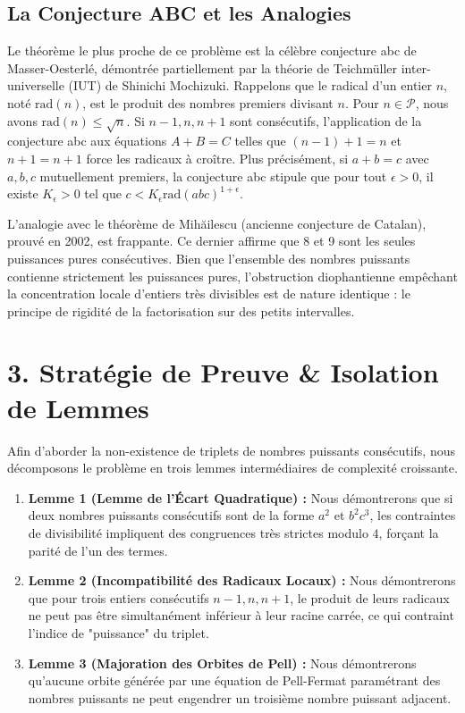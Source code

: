 \documentclass[11pt,a4paper]{article}
\begin{document}
\subsection{La Conjecture ABC et les Analogies}
Le théorème le plus proche de ce problème est la célèbre conjecture abc de Masser-Oesterlé, démontrée partiellement par la théorie de Teichmüller inter-universelle (IUT) de Shinichi Mochizuki.
Rappelons que le radical d'un entier $n$, noté $\text{rad}(n)$, est le produit des nombres premiers divisant $n$. Pour $n \in \mathcal{P}$, nous avons $\text{rad}(n) \le \sqrt{n}$.
Si $n-1, n, n+1$ sont consécutifs, l'application de la conjecture abc aux équations $A+B=C$ telles que $(n-1)+1=n$ et $n+1=n+1$ force les radicaux à croître.
Plus précisément, si $a+b=c$ avec $a,b,c$ mutuellement premiers, la conjecture abc stipule que pour tout $\epsilon > 0$, il existe $K_\epsilon > 0$ tel que $c < K_\epsilon \text{rad}(abc)^{1+\epsilon}$.

L'analogie avec le théorème de Mihăilescu (ancienne conjecture de Catalan), prouvé en 2002, est frappante. Ce dernier affirme que 8 et 9 sont les seules puissances pures consécutives. Bien que l'ensemble des nombres puissants contienne strictement les puissances pures, l'obstruction diophantienne empêchant la concentration locale d'entiers très divisibles est de nature identique : le principe de rigidité de la factorisation sur des petits intervalles.

\newpage
\section{3. Stratégie de Preuve \& Isolation de Lemmes}

Afin d'aborder la non-existence de triplets de nombres puissants consécutifs, nous décomposons le problème en trois lemmes intermédiaires de complexité croissante.

\begin{enumerate}
\item \textbf{Lemme 1 (Lemme de l'Écart Quadratique) :} Nous démontrerons que si deux nombres puissants consécutifs sont de la forme $a^2$ et $b^2 c^3$, les contraintes de divisibilité impliquent des congruences très strictes modulo $4$, forçant la parité de l'un des termes.
\item \textbf{Lemme 2 (Incompatibilité des Radicaux Locaux) :} Nous démontrerons que pour trois entiers consécutifs $n-1, n, n+1$, le produit de leurs radicaux ne peut pas être simultanément inférieur à leur racine carrée, ce qui contraint l'indice de "puissance" du triplet.
\item \textbf{Lemme 3 (Majoration des Orbites de Pell) :} Nous démontrerons qu'aucune orbite générée par une équation de Pell-Fermat paramétrant des nombres puissants ne peut engendrer un troisième nombre puissant adjacent.
\end{enumerate}
\end{document}
